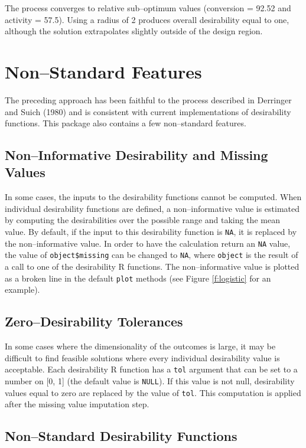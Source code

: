 \documentclass[12pt]{article}
\begin{document}
The process converges to relative sub--optimum values (conversion = 92.52 and activity = 57.5). Using a radius of 2 produces overall desirability equal to one, although the solution extrapolates slightly outside of the design region.


\section{Non--Standard Features}

The preceding approach has been faithful to the process described in Derringer and Suich (1980) and is consistent with current implementations of desirability functions. This package also contains a few non--standard features.

\subsection{Non--Informative Desirability and Missing Values}

In some cases, the inputs to the desirability functions cannot be computed. When individual desirability functions are defined, a non--informative value is estimated by computing the desirabilities over the possible range and taking the mean value. By default, if the input to this desirability function is \texttt{NA}, it is replaced by the non--informative value. In order to have the calculation return an \texttt{NA} value, the value of \texttt{object\$missing} can be changed to \texttt{NA}, where \texttt{object} is the result of a call to one of the desirability R functions. The non--informative value is plotted as a broken line in the default \texttt{plot} methods (see Figure \ref{f:logistic} for an example). 

\subsection{Zero--Desirability Tolerances}

In some cases where the dimensionality of the outcomes is large, it may be difficult to find feasible solutions where every individual desirability value is acceptable. Each desirability R function has a \texttt{tol} argument that can be set to a number on [0, 1] (the default value is \texttt{NULL}). If this value is not null, desirability values equal to zero are replaced by the value of \texttt{tol}. This computation is applied after the missing value imputation step.

\subsection{Non--Standard Desirability Functions}
\end{document}
